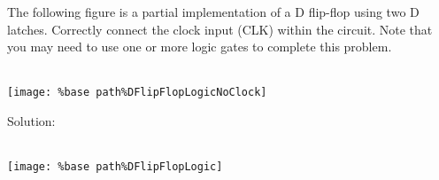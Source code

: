 The following figure is a partial implementation of a D flip-flop using two D latches.  Correctly connect the clock input (CLK) within the circuit.  Note that you may need to use one or more logic gates to complete this problem. \\ \\
\begin{center}
  \texttt{[image: \%base path\%DFlipFlopLogicNoClock]}
\end{center}

Solution: \\ \\
\begin{center}
  \texttt{[image: \%base path\%DFlipFlopLogic]}
\end{center}
